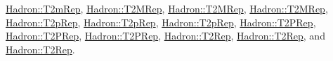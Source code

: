 \mbox{\hyperlink{structHadron_1_1T2mRep}{Hadron\+::\+T2m\+Rep}}, \mbox{\hyperlink{structHadron_1_1T2MRep}{Hadron\+::\+T2\+M\+Rep}}, \mbox{\hyperlink{structHadron_1_1T2MRep}{Hadron\+::\+T2\+M\+Rep}}, \mbox{\hyperlink{structHadron_1_1T2MRep}{Hadron\+::\+T2\+M\+Rep}}, \mbox{\hyperlink{structHadron_1_1T2pRep}{Hadron\+::\+T2p\+Rep}}, \mbox{\hyperlink{structHadron_1_1T2pRep}{Hadron\+::\+T2p\+Rep}}, \mbox{\hyperlink{structHadron_1_1T2pRep}{Hadron\+::\+T2p\+Rep}}, \mbox{\hyperlink{structHadron_1_1T2PRep}{Hadron\+::\+T2\+P\+Rep}}, \mbox{\hyperlink{structHadron_1_1T2PRep}{Hadron\+::\+T2\+P\+Rep}}, \mbox{\hyperlink{structHadron_1_1T2PRep}{Hadron\+::\+T2\+P\+Rep}}, \mbox{\hyperlink{structHadron_1_1T2Rep}{Hadron\+::\+T2\+Rep}}, \mbox{\hyperlink{structHadron_1_1T2Rep}{Hadron\+::\+T2\+Rep}}, and \mbox{\hyperlink{structHadron_1_1T2Rep}{Hadron\+::\+T2\+Rep}}.

